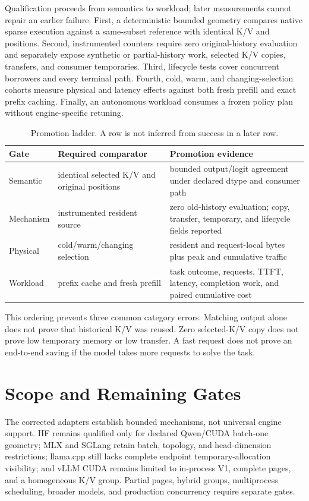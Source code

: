 \documentclass[11pt]{article}
\begin{document}
Qualification proceeds from semantics to workload; later measurements cannot
repair an earlier failure.  First, a deterministic bounded geometry compares
native sparse execution against a same-subset reference with identical K/V and
positions.  Second, instrumented counters require zero original-history
evaluation and separately expose synthetic or partial-history work, selected
K/V copies, transfers, and consumer temporaries.  Third, lifecycle tests cover
concurrent borrowers and every terminal path.  Fourth, cold, warm, and
changing-selection cohorts measure physical and latency effects against both
fresh prefill and exact prefix caching.  Finally, an autonomous workload
consumes a frozen policy plan without engine-specific retuning.

\begin{table}[H]
\centering
\small
\begin{tabularx}{\linewidth}{p{.16\linewidth}p{.30\linewidth}Y}
\toprule
Gate & Required comparator & Promotion evidence \\
\midrule
Semantic & identical selected K/V and original positions & bounded output/logit agreement under declared dtype and consumer path \\
Mechanism & instrumented resident source & zero old-history evaluation; copy, transfer, temporary, and lifecycle fields reported \\
Physical & cold/warm/changing selection & resident and request-local bytes plus peak and cumulative traffic \\
Workload & prefix cache and fresh prefill & task outcome, requests, TTFT, latency, completion work, and paired cumulative cost \\
\bottomrule
\end{tabularx}
\caption{Promotion ladder.  A row is not inferred from success in a later row.}
\label{tab:promotion-ladder}
\end{table}

This ordering prevents three common category errors.  Matching output alone
does not prove that historical K/V was reused.  Zero selected-K/V copy does not
prove low temporary memory or low transfer.  A fast request does not prove an
end-to-end saving if the model takes more requests to solve the task.

\section{Scope and Remaining Gates}

The corrected adapters establish bounded mechanisms, not universal engine
support.  HF remains qualified only for declared Qwen/CUDA batch-one geometry;
MLX and SGLang retain batch, topology, and head-dimension restrictions;
llama.cpp still lacks complete endpoint temporary-allocation visibility; and
vLLM CUDA remains limited to in-process V1, complete pages, and a homogeneous
K/V group.  Partial pages, hybrid groups, multiprocess scheduling, broader
models, and production concurrency require separate gates.
\end{document}
